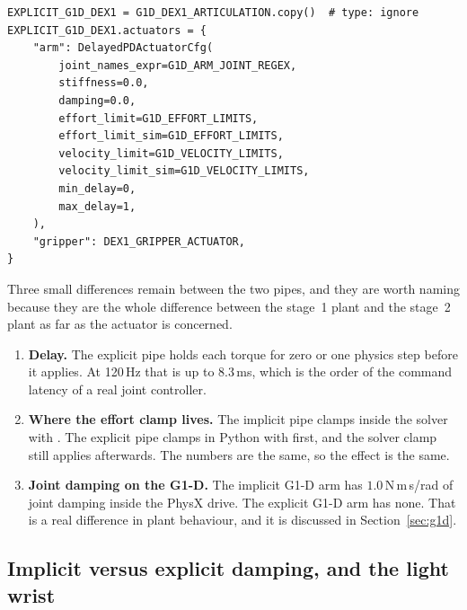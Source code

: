\begin{snippetbox}[11]
\begin{lstlisting}[firstnumber=121]
EXPLICIT_G1D_DEX1 = G1D_DEX1_ARTICULATION.copy()  # type: ignore
EXPLICIT_G1D_DEX1.actuators = {
    "arm": DelayedPDActuatorCfg(
        joint_names_expr=G1D_ARM_JOINT_REGEX,
        stiffness=0.0,
        damping=0.0,
        effort_limit=G1D_EFFORT_LIMITS,
        effort_limit_sim=G1D_EFFORT_LIMITS,
        velocity_limit=G1D_VELOCITY_LIMITS,
        velocity_limit_sim=G1D_VELOCITY_LIMITS,
        min_delay=0,
        max_delay=1,
    ),
    "gripper": DEX1_GRIPPER_ACTUATOR,
}
\end{lstlisting}
\end{snippetbox}

Three small differences remain between the two pipes, and they are worth naming because they are the whole difference between the stage~1 plant and the stage~2 plant as far as the actuator is concerned.
\begin{enumerate}
  \item \textbf{Delay.} The explicit pipe holds each torque for zero or one physics step before it applies. At 120\,Hz that is up to 8.3\,ms, which is the order of the command latency of a real joint controller.
  \item \textbf{Where the effort clamp lives.} The implicit pipe clamps inside the solver with . The explicit pipe clamps in Python with  first, and the solver clamp still applies afterwards. The numbers are the same, so the effect is the same.
  \item \textbf{Joint damping on the G1-D.} The implicit G1-D arm has $1.0$\,N\,m\,s/rad of joint damping inside the PhysX drive. The explicit G1-D arm has none. That is a real difference in plant behaviour, and it is discussed in Section~\ref{sec:g1d}.
\end{enumerate}

\subsection{Implicit versus explicit damping, and the light wrist}
\label{sec:stability}

